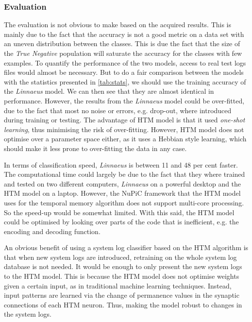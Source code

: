 \subsubsection{Evaluation}
The evaluation is not obvious to make based on the acquired results. This is mainly due to the fact that the accuracy is not a good metric on a data set with an uneven distribution between the classes. This is due the fact that the size of the \textit{True Negative} population will saturate the accuracy for the classes with few examples. To quantify the performance of the two models, access to real test logs files would almost be necessary. But to do a fair comparison between the models with the statistics presented in \autoref{tab:stats}, we should use the training accuracy of the \textit{Linnaeus} model. We can then see that they are almost identical in performance. However, the results from the \textit{Linnaeus} model could be over-fitted, due to the fact that most no noise or errors, e.g. drop-out, where introduced during training or testing. The advantage of HTM model is that it used \textit{one-shot learning}, thus minimising the risk of over-fitting. However, HTM model does not optimise over a parameter space either, as it uses a Hebbian style learning, which should make it less prone to over-fitting the data in any case. 

In terms of classification speed, \textit{Linnaeus} is between 11 and 48 per cent faster. The computational time could largely be due to the fact that they where trained and tested on two different computers, \textit{Linnaeus} on a powerful desktop and the HTM model on a laptop. However, the NuPiC framework that the HTM model uses for the temporal memory algorithm does not support multi-core processing. So the speed-up would be somewhat limited. With this said, the HTM model could be optimised by looking over parts of the code that is inefficient, e.g. the encoding and decoding function. 

An obvious benefit of using a system log classifier based on the HTM algorithm is that when new system logs are introduced, retraining on the whole system log database is not needed. It would be enough to only present the new system logs to the HTM model. This is because the HTM model does not optimise weights given a certain input, as in traditional machine learning techniques. Instead, input patterns are learned via the change of permanence values in the synaptic connections of each HTM neuron. Thus, making the model robust to changes in the system logs.


